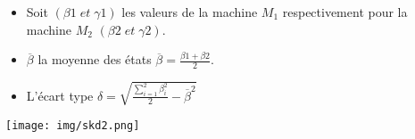 \begin{itemize}
	\item  	Soit $(\beta1 \; et\; \gamma1)$ les valeurs de la machine $M_1$ respectivement pour la machine $M_2$ $(\beta2 \;et\; \gamma2)$.
	\item  	$\overline{\beta}$ la moyenne des états $\overline{\beta}=\frac{\beta1+\beta2}{2}$.
	\item  	L’écart type $\delta=\sqrt{\frac{\displaystyle\sum_{i=1}^{2}\beta_i^2 }{2}-\overline{\beta}^2} $
\end{itemize}
 
	\begin{center}
		\texttt{[image: img/skd2.png]}	
	 \label{skd2}
	\end{center}

